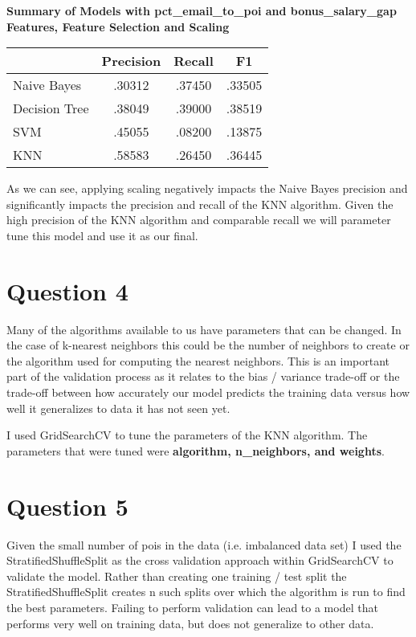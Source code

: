 \documentclass[a4paper,11pt]{report}
\begin{document}
\textbf{Summary of Models with pct\_email\_to\_poi and bonus\_salary\_gap Features,
Feature Selection and Scaling}
\begin{center}
    \begin{tabular}{|| l c c c ||}
        \hline & Precision & Recall & F1 \\
        \hline\hline
        Naive Bayes & .30312 & .37450 & .33505 \\
        \hline
        Decision Tree & .38049 & .39000 & .38519 \\
        \hline
        SVM & .45055 & .08200 & .13875 \\
        \hline
        KNN & .58583 & .26450 & .36445  \\
        \hline
    \end{tabular}
\end{center}

As we can see, applying scaling negatively impacts the Naive Bayes precision and
significantly impacts the precision and recall of the KNN algorithm.  Given the
high precision of the KNN algorithm and comparable recall we will parameter tune
this model and use it as our final.

\section{Question 4}

Many of the algorithms available to us have parameters that can be changed.
In the case of k-nearest neighbors this could be the number of neighbors to
create or the algorithm used for computing the nearest neighbors.  This is an
important part of the validation process as it relates to the bias / variance
trade-off or the trade-off between how accurately our model predicts the
training data versus how well it generalizes to data it has not seen yet.

I used GridSearchCV to tune the parameters of the KNN algorithm.  The parameters
that were tuned were \textbf{algorithm, n\_neighbors, and weights}.
  
\section{Question 5}
Given the small number of pois in the data (i.e. imbalanced data set) I used the
StratifiedShuffleSplit as the cross validation approach within GridSearchCV to
validate the model.  Rather than creating one training / test split the
StratifiedShuffleSplit creates n such splits over which the algorithm is run to
find the best parameters.  Failing to perform validation can lead to a model
that performs very well on training data, but does not generalize to other
data.
\end{document}
